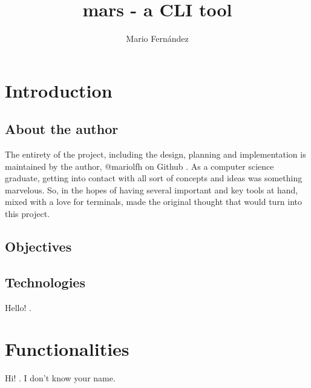 \documentclass{report}
\title{mars - a CLI tool}
\author{Mario Fernández}
\begin{document}
\maketitle

\tableofcontents

\chapter{Introduction}
\section{About the author}
The entirety of the project, including the design, planning and implementation is maintained by the author, @mariolfh on Github \cite{mariolfh}. As a computer science graduate, getting into contact with all sort of concepts and ideas was something marvelous. So, in the hopes of having several important and key tools at hand, mixed with a love for terminals, made the original thought that would turn into this project. 

\section{Objectives}

\section{Technologies}
Hello! \cite{mariolfh}.

\chapter{Functionalities}
Hi! \cite{cosmopolite}. I don't know your name.



\printbibliography
\end{document}
